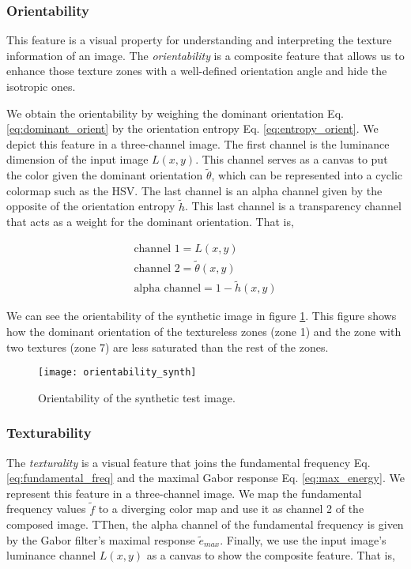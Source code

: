 \subsubsection{Orientability}
This feature is a visual property for understanding and interpreting the texture information of an image. The \textit{orientability} is a composite feature that allows us to enhance those texture zones with a well-defined orientation angle and hide the isotropic ones.

We obtain the orientability by weighing the dominant orientation Eq. \eqref{eq:dominant_orient} by the orientation entropy Eq. \eqref{eq:entropy_orient}. We depict this feature in a three-channel image. The first channel is the luminance dimension of the input image $L(x,y)$. This channel serves as a canvas to put the color given the dominant orientation $\widetilde{\theta}$, which can be represented into a cyclic colormap such as the HSV. The last channel is an alpha channel given by the opposite of the orientation entropy $\widetilde{h}$. This last channel is a transparency channel that acts as a weight for the dominant orientation. That is,

\begin{gather}
    \text{channel 1} = L(x,y) \\
    \text{channel 2} = \widetilde{\theta}(x,y) \\
    \text{alpha channel}= 1 - \widetilde{h}(x,y)
\end{gather}

We can see the orientability of the synthetic image in figure \ref{fig:orientability_synth}. This figure shows how the dominant orientation of the textureless zones (zone 1) and the zone with two textures (zone 7) are less saturated than the rest of the zones. 

\begin{figure}[!ht]
	\texttt{[image: orientability\_synth]}
    \caption{Orientability of the synthetic test image.}
    \label{fig:orientability_synth}
\end{figure}

\subsubsection{Texturability}
The \textit{texturality} is a visual feature that joins the fundamental frequency Eq. \eqref{eq:fundamental_freq} and the maximal Gabor response Eq. \eqref{eq:max_energy}. We represent this feature in a three-channel image. We map the fundamental frequency values $\widetilde{f}$ to a diverging color map and use it as channel 2 of the composed image. TThen, the alpha channel of the fundamental frequency is given by the Gabor filter's maximal response $\widetilde{e}_{max}$. Finally, we use the input image's luminance channel $L(x,y)$ as a canvas to show the composite feature. That is,


